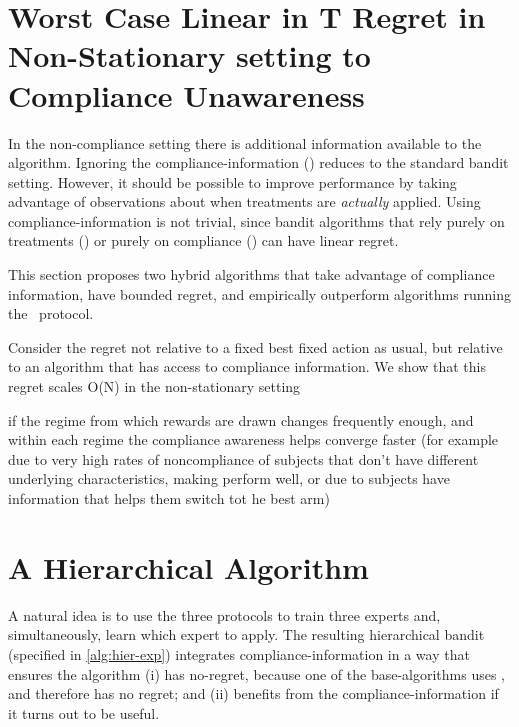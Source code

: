 
\section{Worst Case Linear in T Regret in Non-Stationary setting to Compliance Unawareness}


In the non-compliance setting there is additional information available to the algorithm. Ignoring the compliance-information (\chosen) reduces to the standard bandit setting. However, it should be possible to improve performance by taking advantage of observations about when treatments are \emph{actually} applied. Using compliance-information is not trivial, since bandit algorithms that rely purely on treatments (\actual) or purely on compliance (\comply) can have linear regret.

This section proposes two hybrid algorithms that take advantage of compliance information, have bounded regret, and empirically outperform algorithms running the \chosen\, protocol.


Consider the regret not relative to a fixed best fixed action as usual, but relative to an algorithm that has access to compliance information. We show that this regret scales O(N) in the non-stationary setting 

if the regime from which rewards are drawn changes frequently enough, and within each regime the compliance awareness helps converge faster (for example due to very high rates of noncompliance of subjects that don't have different underlying characteristics, making \actual perform well, or due to subjects have information that helps them switch tot he best arm) 


\section{A Hierarchical Algorithm}

A natural idea is to use the three protocols to train three experts and, simultaneously, learn which expert to apply. The resulting hierarchical bandit (specified in  \ref{alg:hier-exp}) integrates compliance-information in a way that ensures the algorithm (i) has no-regret, because one of the base-algorithms uses \chosen, and therefore has no regret; and (ii) benefits from the compliance-information if it turns out to be useful.

